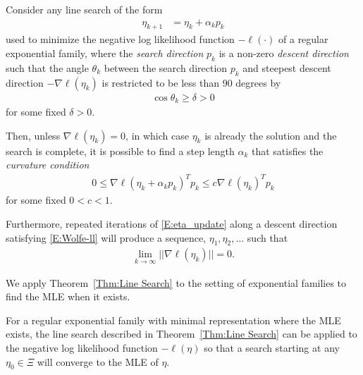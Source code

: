 \documentclass[oneside]{myumnStatThesis}
\begin{document}
\begin{theorem} \label{Thm:log like max}
Consider any line search of the form 
\begin{align}
	\eta_{k+1} &= \eta_k + \alpha_k p_k \label{E:eta_update}
\end{align}
used to minimize the negative log likelihood function $-\ell(\cdot)$ of a regular exponential family, where the \emph{search direction} $p_k$ is a non-zero \emph{descent direction}
such that the angle $\theta_k$ between the search direction $p_k$ and steepest descent direction $-\nabla \ell(\eta_k)$ is 
restricted to be less than 90 degrees by
\begin{align*}
\cos \theta_k \geq \delta > 0
\end{align*}
 for some fixed $\delta > 0$.  

Then, unless $\nabla \ell(\eta_k) = 0$, in which case $\eta_k$ is already the solution and the search is complete, it is 
possible to find a step length $\alpha_k$ that satisfies the \emph{curvature condition}
\begin{align}
	0 \leq \nabla \ell( \eta_k + \alpha_k p_k)^T p_k  \leq c \nabla \ell(\eta_k)^T p_k  \label{E:Wolfe-ll}
\end{align}
for some fixed $0 < c < 1$.

Furthermore, repeated iterations of \eqref{E:eta_update} along a descent direction satisfying \eqref{E:Wolfe-ll} will produce a sequence, $\eta_1, \eta_2, \ldots$ such that
\begin{align*}
	\lim_{k \to \infty} || \nabla \ell(\eta_k) || = 0.
\end{align*}
\end{theorem}



We apply Theorem~\ref{Thm:Line Search} to the setting of exponential families to find the MLE when it exists.  

\begin{theorem}[] \label{Thm:Line Search works}
For a regular exponential family with minimal representation where the MLE exists, the line search described in 
Theorem~\ref{Thm:Line Search} can be applied to the negative log likelihood function $-\ell(\eta)$ so that a search 
starting at any $\eta_0 \in \Xi$ will converge to the MLE of $\eta$.
\end{theorem}
\end{document}
